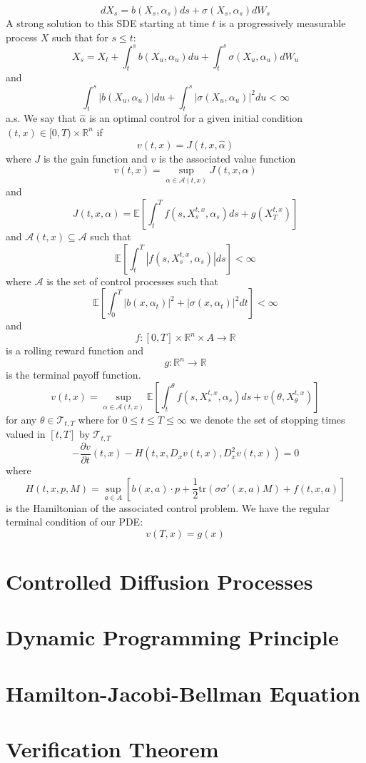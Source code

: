 $$dX_s=b(X_s,\alpha_s)ds+\sigma(X_s,\alpha_s)dW_s$$
A strong solution to this SDE starting at time $t$ is a progressively measurable process $X$ such that for $s\leq t$:
$$X_s=X_t+\int_{t}^{s}b(X_u,\alpha_u)du+\int_t^s\sigma(X_u,\alpha_u)dW_u$$
and
$$\int_t^s|b(X_u,\alpha_u)|du+\int_t^s|\sigma(X_u,\alpha_u)|^2du<\infty$$
a.s.
We say that $\hat{\alpha}$ is an optimal control for a given initial condition $ (t,x) \in [0,T) \times \mathbb{R}^n $ if
$$v(t,x)=J(t,x,\hat{\alpha})$$
where $J$ is the gain function and $v$ is the associated value function
$$v(t,x)=\sup\limits_{\alpha\in\mathcal{A}(t,x)}J(t,x,\alpha)$$
and
$$J(t,x,\alpha)=\mathbb{E}\left[\int_t^Tf(s,X_s^{t,x},\alpha_s)ds+g(X_T^{t,x})\right]$$
and $\mathcal{A}(t,x)\subseteq\mathcal{A}$ such that
$$\mathbb{E}\left[\int_t^T|f(s,X_s^{t,x},\alpha_s)|ds\right]<\infty$$
where $\mathcal{A}$ is the set of control processes such that
$$\mathbb{E}\left[\int_0^T|b(x,\alpha_t)|^2+|\sigma(x,\alpha_t)|^2dt\right]<\infty$$
and
$$f:[0,T]\times\mathbb{R}^n\times A\rightarrow\mathbb{R}$$
is a rolling reward function and 
$$g:\mathbb{R}^n\rightarrow\mathbb{R}$$
is the terminal payoff function.
$$v(t,x)=\sup\limits_{\alpha\in\mathcal{A}(t,x)}\mathbb{E}\left[\int_t^\theta f(s,X_s^{t,x},\alpha_s)ds+v(\theta,X_\theta^{t,x})\right]$$
for any $\theta\in\mathcal{T}_{t,T}$ where for $0\leq t\leq T\leq\infty$ we denote the set of stopping times valued in $[t,T]$ by $\mathcal{T}_{t,T}$
$$-\frac{\partial v}{\partial t}(t,x)-H(t,x,D_xv(t,x),D^2_xv(t,x))=0$$
where
$$H(t,x,p,M)=\sup\limits_{a\in A}\left[b(x,a)\cdot p+\frac{1}{2}\textrm{tr}(\sigma\sigma'(x,a)M)+f(t,x,a)\right]$$
is the Hamiltonian of the associated control problem. We have the regular terminal condition of our PDE:
$$v(T,x)=g(x)$$
\section{Controlled Diffusion Processes}
\section{Dynamic Programming Principle}
\section{Hamilton-Jacobi-Bellman Equation}
\section{Verification Theorem}